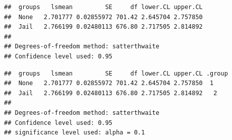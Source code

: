 \begin{frame}[fragile]

\begin{Shaded}
\begin{Highlighting}[]
\StringTok{ }\NormalTok{))}
\end{Highlighting}
\end{Shaded}

\begin{verbatim}
##  groups   lsmean         SE     df lower.CL upper.CL
##  None   2.701777 0.02855972 701.42 2.645704 2.757850
##  Jail   2.766199 0.02480113 676.80 2.717505 2.814892
## 
## Degrees-of-freedom method: satterthwaite 
## Confidence level used: 0.95
\end{verbatim}

\end{frame}

\begin{frame}[fragile]

\begin{Shaded}
\begin{Highlighting}[]
\NormalTok{)}
\end{Highlighting}
\end{Shaded}

\begin{verbatim}
##  groups   lsmean         SE     df lower.CL upper.CL .group
##  None   2.701777 0.02855972 701.42 2.645704 2.757850  1    
##  Jail   2.766199 0.02480113 676.80 2.717505 2.814892   2   
## 
## Degrees-of-freedom method: satterthwaite 
## Confidence level used: 0.95 
## significance level used: alpha = 0.1
\end{verbatim}

\end{frame}

